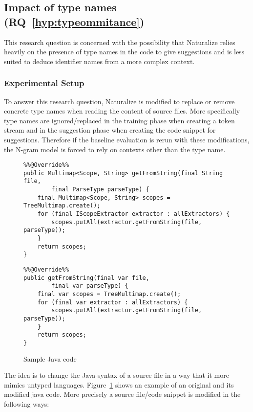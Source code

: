 \subsection{Impact of type names (RQ~\ref{hyp:typeommitance})}
This research question is concerned with the possibility that Naturalize relies heavily on the presence of type names in the code to give suggestions and is less suited to deduce identifier names from a more complex context.

\subsubsection{Experimental Setup}
To answer this research question, Naturalize is modified to replace or remove concrete type names when reading the content of source files. More specifically type names are ignored/replaced in the training phase when creating a token stream and in the suggestion phase when creating the code snippet for suggestions. Therefore if the baseline evaluation is rerun with these modifications, the N-gram model is forced to rely on contexts other than the type name.

\begin{figure}
    \centering
\begin{lstlisting}
%%@Override%%
public Multimap<Scope, String> getFromString(final String file,
		final ParseType parseType) {
	final Multimap<Scope, String> scopes = TreeMultimap.create();
	for (final IScopeExtractor extractor : allExtractors) {
		scopes.putAll(extractor.getFromString(file, parseType));
	}
	return scopes;
}
\end{lstlisting}%
\begin{lstlisting}
%%@Override%%
public getFromString(final var file,
		final var parseType) {
	final var scopes = TreeMultimap.create();
	for (final var extractor : allExtractors) {
		scopes.putAll(extractor.getFromString(file, parseType));
	}
	return scopes;
}
\end{lstlisting}%
    \caption{Sample Java code}
    \label{fig:meth_javacode}
\end{figure}

The idea is to change the Java-syntax of a source file in a way that it more mimics untyped languages. Figure~\ref{fig:meth_javacode} shows an example of an original and its modified java code. More precisely a source file/code snippet is modified in the following ways:


